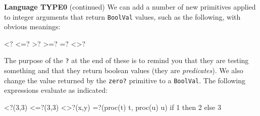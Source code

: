 \begin{minipage}[t]{\sw}
\slidenumber
\LARGE
{\bf Language TYPE0} (continued)\exx
\Large
We can add a number of new primitives applied to integer arguments
that return \verb'BoolVal' values,
such as the following, with obvious meanings:
\large
\begin{qv}
<?
<=?
>?
>=?
=?
<>?
\end{qv}
\Large
The purpose of the \verb'?' at the end of these
is to remind you that they are testing something
and that they return boolean values
(they are {\em predicates}).
We also change the value returned by the \verb'zero?' primitive
to a \verb'BoolVal'.\exx
The following expressions evaluate as indicated:
\large
\begin{qv}
<?(3,3)
<=?(3,3)
<>?(x,y)
=?(proc(t) t, proc(u) u)
if 1 then 2 else 3
\end{qv}
\Large
\end{minipage}
